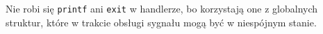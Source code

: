 Nie robi się \texttt{printf} ani \texttt{exit} w handlerze, bo korzystają one z globalnych struktur, które w trakcie obsługi sygnału mogą być w niespójnym stanie.
